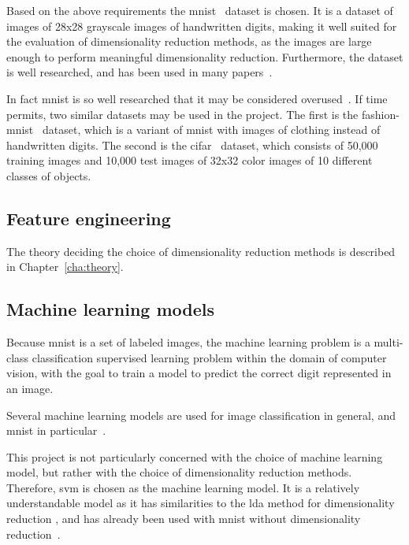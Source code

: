 Based on the above requirements the \gls{mnist}~\cite{lecun-mnist-database} dataset is chosen. It is a dataset of images of 28x28 grayscale images of handwritten digits, making it well suited for the evaluation of dimensionality reduction methods, as the images are large enough to perform meaningful dimensionality reduction. Furthermore, the dataset is well researched, and has been used in many papers~\cite{lecun-mnist-database}.

In fact \gls{mnist} is so well researched that it may be considered overused~\cite{fashion-mnist}. If time permits, two similar datasets may be used in the project. The first is the \gls{fashion-mnist}~\cite{fashion-mnist} dataset, which is a variant of \gls{mnist} with images of clothing instead of handwritten digits. The second is the \gls{cifar}~\cite{krizhevsky-cifar} dataset, which consists of 50,000 training images and 10,000 test images of 32x32 color images of 10 different classes of objects.


\subsection{Feature engineering}\label{subsec:feature-engineering}
The theory deciding the choice of dimensionality reduction methods is described in Chapter~\ref{cha:theory}.


\subsection{Machine learning models}\label{subsec:machine-learning-models}
Because \gls{mnist} is a set of labeled images, the machine learning problem is a multi-class classification supervised learning problem within the domain of computer vision, with the goal to train a model to predict the correct digit represented in an image.

Several machine learning models are used for image classification in general, and \gls{mnist} in particular~\cite{lecun-mnist-database,IBM-computer-vision,convolutional-neural-networks-convnets,multi-column-neural-network-ciregan}.

This project is not particularly concerned with the choice of machine learning model, but rather with the choice of dimensionality reduction methods. Therefore, \gls{svm} is chosen as the machine learning model. It is a relatively understandable model as it has similarities to the \gls{lda} method for dimensionality reduction , and has already been used with \gls{mnist} without dimensionality reduction~\cite{lecun-mnist-database}.

